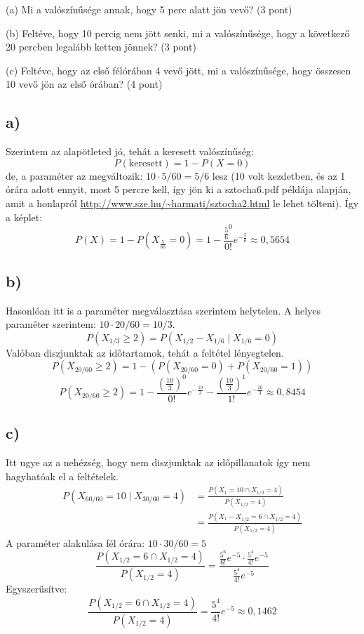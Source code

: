 \documentclass[a4paper,12pt]{article}   		%
\begin{document}
(a) Mi a valószínűsége annak, hogy 5 perc alatt jön vevő? (3 pont)

(b) Feltéve, hogy 10 percig nem jött senki, mi a valószínűsége, hogy a
következő 20 percben legalább ketten jönnek? (3 pont)

(c) Feltéve, hogy az első félórában 4 vevő jött, mi a valószínűsége, 
hogy összesen 10 vevő jön az első órában? (4 pont)

\subsection*{a)}
Szerintem az alapötleted jó, tehát a keresett valószínűség:
\[P(\text{keresett}) = 1 - P(X = 0)\]
de, a paraméter az megváltozik: $10 \cdot 5/60 = 5/6$ lesz (10 volt kezdetben, 
és az 1 órára adott ennyit, most 5 percre kell, így jön ki a
\mbox{sztocha6.pdf} példája alapján, amit a honlapról 
\url{http://www.sze.hu/~harmati/sztocha2.html} le lehet tölteni). 
Így a képlet:
\[P(X) = 1 - P(X_\frac{5}{60} = 0) = 1 - \frac{\frac{5}{6}^0}{0!}
e^{-\frac{5}{6}} \approx 0,5654\]

\subsection*{b)}
Hasonlóan itt is a paraméter megválasztása szerintem helytelen. A helyes 
paraméter szerintem: $10 \cdot 20/60 = 10/3$.
\[P(X_{1/3} \geq 2) = P(X_{1/2}-X_{1/6} \mid X_{1/6}=0)\]
Valóban diszjunktak az időtartamok, tehát a feltétel lényegtelen.
\[
P(X_{20/60} \geq 2) = 1 - \left( P(X_{20/60} = 0)+P(X_{20/60} = 1)\right)
\]
\[
P(X_{20/60} \geq 2) = 1 - \frac{\left(\frac{10}{3}\right)^0}{0!}e^
{-\frac{10}{3}} - \frac{\left(\frac{10}{3}\right)^1}{1!}e^{-\frac{10}{3}} 
\approx 0,8454
\]

\subsection*{c)}
Itt ugye az a nehézség, hogy nem diszjunktak az időpillanatok így nem
hagyhatóak el a feltételek.
\begin{equation*}
\begin{split}
P(X_{60/60} = 10 \mid X_{30/60} = 4) &= \frac{P(X_1 = 10 \cap X_{1/2} = 4)}
{P(X_{1/2} = 4)} \\
&= \frac{P(X_1-X_{1/2} = 6 \cap X_{1/2} = 4)}{P(X_{1/2} = 4)}
\end{split}
\end{equation*}
A paraméter alakulása fél órára: $10 \cdot 30/60 = 5$
\[
\frac{P(X_{1/2} = 6 \cap X_{1/2} = 4)}{P(X_{1/2} = 4)} = \frac{\frac{5^6}{6!}
e^{-5} \cdot \frac{5^4}{4!} e^{-5}}{\frac{5^4}{4!} e^{-5}}
\]
Egyszerűsítve:
\[
\frac{P(X_{1/2} = 6 \cap X_{1/2} = 4)}{P(X_{1/2} = 4)} = 
\frac{5^4}{4!} e^{-5} \approx 0,1462
\]
\end{document}
